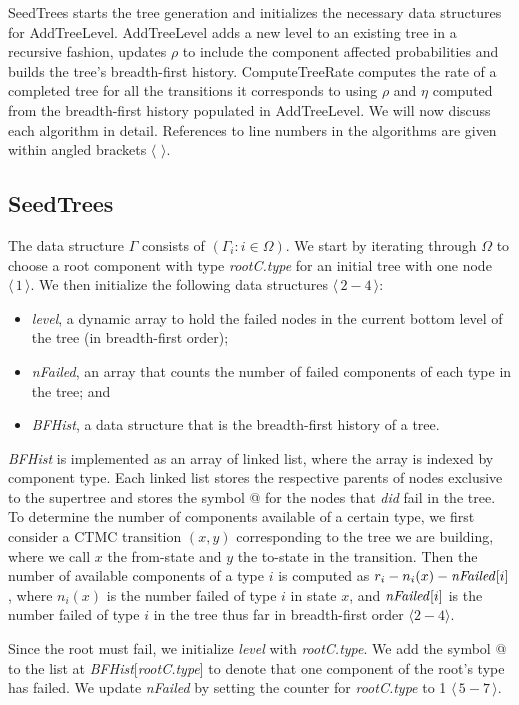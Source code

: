 \documentclass[12pt]{article}
\newcommand{\varName}[1]{\textrm{\it#1}}
\newcommand{\citeLine}[1]{$\langle \, #1 \, \rangle$}
\newcommand{\citeBlock}[2]{$\langle \, #1 - #2 \, \rangle$}
\begin{document}
SeedTrees starts the tree generation and initializes the necessary data structures for AddTreeLevel. AddTreeLevel adds a new level to an existing tree in a recursive fashion, updates $\rho$ to include the component affected probabilities and builds the tree's breadth-first history. ComputeTreeRate computes the rate of a completed tree for all the transitions it corresponds to using $\rho$ and $\eta$ computed from the breadth-first history populated in AddTreeLevel. We will now discuss each algorithm in detail. References to line numbers in the algorithms are given within angled brackets \citeLine{}.

\subsection{SeedTrees}

The data structure $\Gamma$ consists of $(\Gamma_i : i \in \Omega)$. We start by iterating through $\Omega$ to choose a root component with type \varName{rootC.type} for an initial tree with one node \citeLine{1}. We then initialize the following data structures \citeBlock{2}{4}: \begin{itemize} \item \varName{level}, a dynamic array to hold the failed nodes in the current bottom level of the tree (in breadth-first order); \item \varName{nFailed}, an array that counts the number of failed components of each type in the tree; and \item \varName{BFHist}, a data structure that is the breadth-first history of a tree. \end{itemize} \varName{BFHist} is implemented as an array of linked list, where the array is indexed by component type. Each linked list stores the respective parents of nodes exclusive to the supertree and stores the symbol @ for the nodes that \textit{did} fail in the tree. To determine the number of components available of a certain type, we first consider a CTMC transition $(x, y)$ corresponding to the tree we are building, where we call $x$ the from-state and $y$ the to-state in the transition. Then the number of available components of a type $i$ is computed as $r_i - n_i(x) - \mbox{\textit{nFailed}}[i]$, where $n_i(x)$ is the number failed of type $i$ in state $x$, and $\mbox{\textit{nFailed}}[i]$ is the number failed of type $i$ in the tree thus far in breadth-first order $\langle 2-4 \rangle$.

Since the root must fail, we initialize \varName{level} with \varName{rootC.type}. We add the symbol @ to the list at \varName{BFHist}[\varName{rootC.type}] to denote that one component of the root's type has failed. We update \varName{nFailed} by setting the counter for \varName{rootC.type} to 1 \citeBlock{5}{7}.
\end{document}
